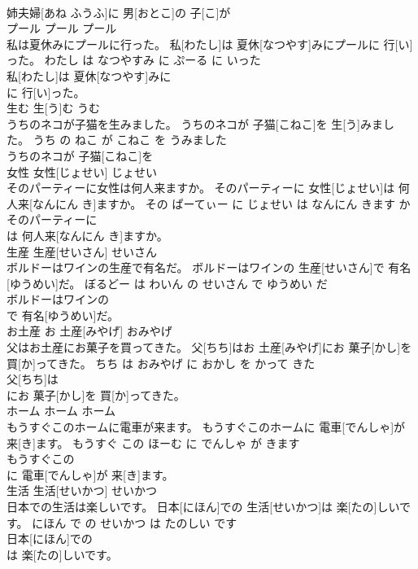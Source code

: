\documentclass[8pt]{extreport}
\begin{document}
\begin{CJK}{UTF8}{min}
\\	姉夫婦[あね ふうふ]に 男[おとこ]の 子[こ]が
\\	プール	プール	プール	
\\	私は夏休みにプールに行った。	私[わたし]は 夏休[なつやす]みにプールに 行[い]った。	わたし は なつやすみ に ぷーる に いった	
\\	私[わたし]は 夏休[なつやす]みに
\\	に 行[い]った。			
\\	生む	生[う]む	うむ	
\\	うちのネコが子猫を生みました。	うちのネコが 子猫[こねこ]を 生[う]みました。	うち の ねこ が こねこ を うみました	
\\	うちのネコが 子猫[こねこ]を
\\	女性	女性[じょせい]	じょせい	
\\	そのパーティーに女性は何人来ますか。	そのパーティーに 女性[じょせい]は 何人来[なんにん き]ますか。	その ぱーてぃー に じょせい は なんにん きます か	
\\	そのパーティーに
\\	は 何人来[なんにん き]ますか。			
\\	生産	生産[せいさん]	せいさん	
\\	ボルドーはワインの生産で有名だ。	ボルドーはワインの 生産[せいさん]で 有名[ゆうめい]だ。	ぼるどー は わいん の せいさん で ゆうめい だ	
\\	ボルドーはワインの
\\	で 有名[ゆうめい]だ。			
\\	お土産	お 土産[みやげ]	おみやげ	
\\	父はお土産にお菓子を買ってきた。	父[ちち]はお 土産[みやげ]にお 菓子[かし]を 買[か]ってきた。	ちち は おみやげ に おかし を かって きた	
\\	父[ちち]は
\\	にお 菓子[かし]を 買[か]ってきた。			
\\	ホーム	ホーム	ホーム	
\\	もうすぐこのホームに電車が来ます。	もうすぐこのホームに 電車[でんしゃ]が 来[き]ます。	もうすぐ この ほーむ に でんしゃ が きます	
\\	もうすぐこの
\\	に 電車[でんしゃ]が 来[き]ます。			
\\	生活	生活[せいかつ]	せいかつ	
\\	日本での生活は楽しいです。	日本[にほん]での 生活[せいかつ]は 楽[たの]しいです。	にほん で の せいかつ は たのしい です	
\\	日本[にほん]での
\\	は 楽[たの]しいです。			

\end{CJK}
\end{document}
